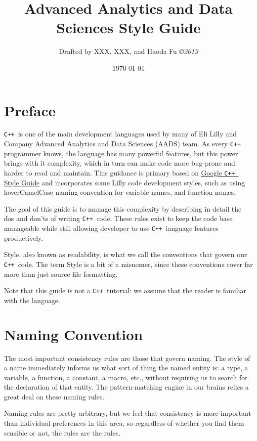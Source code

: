 \documentclass[12pt,reqno]{book}      %
\title{Advanced Analytics and Data Sciences  \Cpp Style Guide}
\author{\htmladdnormallink           %
{Drafted by XXX, XXX, and Haoda Fu}{}
{\small\em \copyright 2019}}
\date{\today}
\def\Cpp{\texttt{C++ }}
\begin{document}
\maketitle
\tableofcontents
\listoffigures
\listoftables
\chapter*{Preface}\normalsize
\pagestyle{plain}
\Cpp is one of the main development languages used by many of Eli Lilly and Company Advanced Analytics and Data Sciences (AADS)  team. As every \Cpp programmer knows, the language has many powerful features, but this power brings with it complexity, which in turn can make code more bug-prone and harder to read and maintain. This guidance is primary based on \href{https://google.github.io/styleguide/cppguide.html}{Google \Cpp Style Guide} and incorporates some Lilly code development styles, such as using lowerCamelCase naming convention for variable names, and function names. 

The goal of this guide is to manage this complexity by describing in detail the dos and don'ts of writing \Cpp code. These rules exist to keep the code base manageable while still allowing developer to use \Cpp language features productively.

Style, also known as readability, is what we call the conventions that govern our \Cpp code. The term Style is a bit of a misnomer, since these conventions cover far more than just source file formatting.

Note that this guide is not a \Cpp tutorial: we assume that the reader is familiar with the language.

\pagestyle{headings}

\chapter{Naming Convention}
The most important consistency rules are those that govern naming. The style of a name immediately informs us what sort of thing the named entity is: a type, a variable, a function, a constant, a macro, etc., without requiring us to search for the declaration of that entity. The pattern-matching engine in our brains relies a great deal on these naming rules.

Naming rules are pretty arbitrary, but we feel that consistency is more important than individual preferences in this area, so regardless of whether you find them sensible or not, the rules are the rules.
\end{document}
